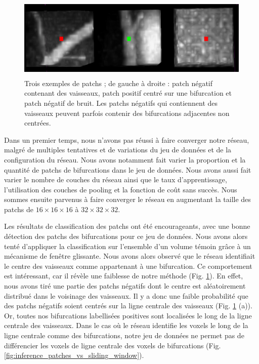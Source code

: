 \begin{figure}[!ht]
    \centering
    \includegraphics[height=4cm]{Images/exp_patchs_exemple.png}
    \caption{Trois exemples de patchs ; de gauche à droite : patch négatif contenant des vaisseaux, patch positif centré sur une bifurcation et patch négatif de bruit. Les patchs négatifs qui contiennent des vaisseaux peuvent parfois contenir des bifurcations adjacentes non centrées.}
    \label{fig:exp_patchs}
\end{figure}

Dans un premier temps, nous n'avons pas réussi à faire converger notre réseau, malgré de multiples tentatives et de variations du jeu de données et de la configuration du réseau. Nous avons notamment fait varier la proportion et la quantité de patchs de bifurcations dans le jeu de données. Nous avons aussi fait varier le nombre de couches du réseau ainsi que le taux d'apprentissage, l'utilisation des couches de pooling et la fonction de coût sans succès. Nous sommes ensuite parvenus à faire converger le réseau en augmentant la taille des patchs de  $16 \times 16 \times 16$ à $32 \times 32 \times 32$.

Les résultats de classification des patchs ont été encourageants, avec une bonne détection des patchs des bifurcations pour ce jeu de données. Nous avons alors tenté d'appliquer la classification sur l'ensemble d'un volume témoin grâce à un mécanisme de fenêtre glissante. Nous avons alors observé que le réseau identifiait le centre des vaisseaux comme appartenant à une bifurcation. Ce comportement est intéressant, car il révèle une faiblesse de notre méthode (Fig. \ref{fig:exp_patchs}). En effet, nous avons tiré une partie des patchs négatifs dont le centre est aléatoirement distribué dans le voisinage des vaisseaux. Il y a donc une faible probabilité que des patchs négatifs soient centrés sur la ligne centrale des vaisseaux (Fig. \ref{fig:exp_patchs} (a)). Or, toutes nos bifurcations labellisées positives sont localisées le long de la ligne centrale des vaisseaux. Dans le cas où le réseau identifie les voxels le long de la ligne centrale comme des bifurcations, notre jeu de données ne permet pas de différencier les voxels de ligne centrale des voxels de bifurcations (Fig. \ref{fig:inference_patches_vs_sliding_window}).

